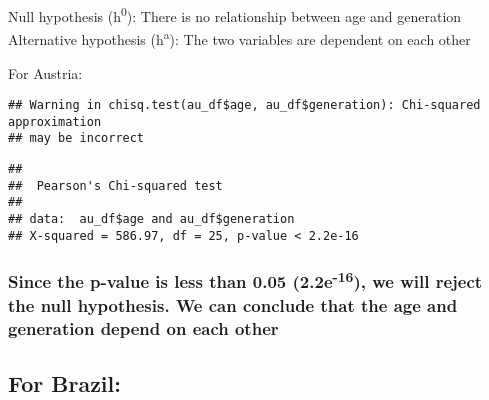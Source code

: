 \documentclass[
]{article}
\newenvironment{Shaded}{\begin{snugshade}}{\end{snugshade}}
\newcommand{\FunctionTok}[1]{\textcolor[rgb]{0.00,0.00,0.00}{#1}}
\newcommand{\NormalTok}[1]{#1}
\newcommand{\SpecialCharTok}[1]{\textcolor[rgb]{0.00,0.00,0.00}{#1}}
\begin{document}
Null hypothesis (h\textsuperscript{0}): There is no relationship between
age and generation Alternative hypothesis (h\textsuperscript{a}): The
two variables are dependent on each other

For Austria:

\begin{Shaded}
\end{Shaded}

\begin{verbatim}
## Warning in chisq.test(au_df$age, au_df$generation): Chi-squared approximation
## may be incorrect
\end{verbatim}

\begin{verbatim}
## 
##  Pearson's Chi-squared test
## 
## data:  au_df$age and au_df$generation
## X-squared = 586.97, df = 25, p-value < 2.2e-16
\end{verbatim}

\hypertarget{since-the-p-value-is-less-than-0.05-2.2e-16-we-will-reject-the-null-hypothesis.-we-can-conclude-that-the-age-and-generation-depend-on-each-other}{%
\subsubsection{\texorpdfstring{Since the p-value is less than 0.05
(2.2e\textsuperscript{-16}), we will reject the null hypothesis. We can
conclude that the age and generation depend on each
other}{Since the p-value is less than 0.05 (2.2e-16), we will reject the null hypothesis. We can conclude that the age and generation depend on each other}}\label{since-the-p-value-is-less-than-0.05-2.2e-16-we-will-reject-the-null-hypothesis.-we-can-conclude-that-the-age-and-generation-depend-on-each-other}}

\hypertarget{for-brazil-1}{%
\subsection{For Brazil:}\label{for-brazil-1}}

\begin{Shaded}
\end{Shaded}
\end{document}
